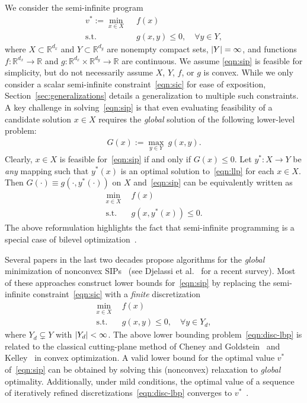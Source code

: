 \documentclass{article}
\DeclarePairedDelimiter\abs{\lvert}{\rvert}%
\newcommand{\R}{\mathbb{R}}
\newcommand{\1}[1]{\mathds{1}\left[#1\right]}
\begin{document}
We consider the semi-infinite program
\begin{align}
\label{eqn:sip}
v^* := \min_{x \in X} \:\: & f(x) \tag{SIP} \\
\text{s.t.} \:\: & g(x,y) \leq 0, \quad \forall y \in Y, \label{eqn:sic}
\end{align}
where $X \subset \R^{d_x}$ and $Y \subset \R^{d_y}$ are nonempty compact sets, $\abs{Y} = \infty$, and functions $f: \R^{d_x} \to \R$ and $g: \R^{d_x} \times \R^{d_y} \to \R$ are continuous.
We assume \eqref{eqn:sip} is feasible for simplicity, but do not necessarily assume $X$, $Y$, $f$, or $g$ is convex.
While we only consider a scalar semi-infinite constraint~\eqref{eqn:sic} for ease of exposition, Section~\ref{sec:generalizations} details a generalization to multiple such constraints.
A key challenge in solving~\eqref{eqn:sip} is that even evaluating feasibility of a candidate solution $x \in X$ requires the \textit{global} solution of the following lower-level problem:
\begin{align}
\label{eqn:llp}
G(x) := \max_{y \in Y} \: g(x,y). \tag{LLP($x$)}
\end{align}
Clearly, $x \in X$ is feasible for~\eqref{eqn:sip} if and only if $G(x) \leq 0$.
Let $y^* : X \to Y$ be \textit{any} mapping such that $y^*(x)$ is an optimal solution to~\eqref{eqn:llp} for each $x \in X$.
Then $G(\cdot) \equiv g(\cdot,y^*(\cdot))$ on $X$ and~\eqref{eqn:sip} can be equivalently written as
\begin{align}
\label{eqn:bilevel_reform}
\min_{x \in X} \:\: & f(x) \\
\text{s.t.} \:\: & g(x,y^*(x)) \leq 0. \nonumber
\end{align}
The above reformulation highlights the fact that semi-infinite programming is a special case of bilevel optimization~\cite{dempe2002foundations,stein2003bi}.


Several papers in the last two decades propose algorithms for the \textit{global} minimization of nonconvex SIPs~\cite{bhattacharjee2005global,floudas2008adaptive,mitsos2008relaxation,mitsos2011global,tsoukalas2011feasible,stein2012adaptive,djelassi2017hybrid,marendet2020standard} (see Djelassi et al.\ \cite{djelassi2020discretization,djelassi2021recent} for a recent survey). 
Most of these approaches construct lower bounds for~\eqref{eqn:sip} by replacing the semi-infinite constraint~\eqref{eqn:sic} with a \textit{finite} discretization
\begin{align}
\label{eqn:disc-lbp}
\min_{x \in X} \:\: & f(x) \tag{LBP} \\
\text{s.t.} \:\: & g(x,y) \leq 0, \quad \forall y \in Y_d, \nonumber
\end{align}
where $Y_d \subsetneq Y$ with $\abs{Y_d} < \infty$.
The above lower bounding problem~\eqref{eqn:disc-lbp} is related to the classical cutting-plane method of Cheney and Goldstein~\cite{cheney1959newton} and Kelley~\cite{kelley1960cutting} in convex optimization.
A valid lower bound for the optimal value $v^*$ of~\eqref{eqn:sip} can be obtained by solving this (nonconvex) relaxation to {\it global} optimality.
Additionally, under mild conditions, the optimal value of a sequence of iteratively refined discretizations~\eqref{eqn:disc-lbp} converges to $v^*$~\cite{lopez2007semi}.
\end{document}
